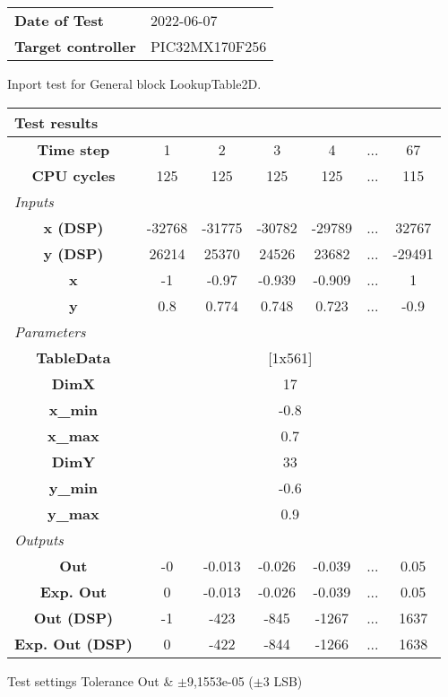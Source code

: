 \begin{tabular}{l l}
\textbf{Date of Test} & 2022-06-07 \tabularnewline
\textbf{Target controller} & PIC32MX170F256 \tabularnewline
\end{tabular}
\vspace{1ex}
Inport test for General block LookupTable2D.

\vspace{1em}
\begin{tabularx}{\textwidth}{|c|c|c|c|c|>{\centering\arraybackslash}X|c|}
\hline
\multicolumn{7}{|l|}{\cellcolor[gray]{0.8}\textbf{Test results}} \tabularnewline \hline
\textbf{Time step} & 1 & 2 & 3 & 4 & ... & 67 \tabularnewline \hline
\textbf{CPU cycles} & 125 & 125 & 125 & 125 & ... & 115 \tabularnewline \hline
\multicolumn{7}{|l|}{\cellcolor[gray]{0.9}\textit{Inputs}} \tabularnewline \hline
\textbf{x (DSP)} & -32768 & -31775 & -30782 & -29789 & ... & 32767 \tabularnewline \hline
\textbf{y (DSP)} & 26214 & 25370 & 24526 & 23682 & ... & -29491 \tabularnewline \hline
\textbf{x} & -1 & -0.97 & -0.939 & -0.909 & ... & 1 \tabularnewline \hline
\textbf{y} & 0.8 & 0.774 & 0.748 & 0.723 & ... & -0.9 \tabularnewline \hline
\multicolumn{7}{|l|}{\cellcolor[gray]{0.9}\textit{Parameters}} \tabularnewline \hline
\textbf{TableData} & \multicolumn{6}{c|}{[1x561]} \tabularnewline \hline
\textbf{DimX} & \multicolumn{6}{c|}{17} \tabularnewline \hline
\textbf{x\_min} & \multicolumn{6}{c|}{-0.8} \tabularnewline \hline
\textbf{x\_max} & \multicolumn{6}{c|}{0.7} \tabularnewline \hline
\textbf{DimY} & \multicolumn{6}{c|}{33} \tabularnewline \hline
\textbf{y\_min} & \multicolumn{6}{c|}{-0.6} \tabularnewline \hline
\textbf{y\_max} & \multicolumn{6}{c|}{0.9} \tabularnewline \hline
\multicolumn{7}{|l|}{\cellcolor[gray]{0.9}\textit{Outputs}} \tabularnewline \hline
\textbf{Out} & -0 & -0.013 & -0.026 & -0.039 & ... & 0.05 \tabularnewline \hline
\textbf{Exp. Out} & 0 & -0.013 & -0.026 & -0.039 & ... & 0.05 \tabularnewline \hline
\textbf{Out (DSP)} & -1 & -423 & -845 & -1267 & ... & 1637 \tabularnewline \hline
\textbf{Exp. Out (DSP)} & 0 & -422 & -844 & -1266 & ... & 1638 \tabularnewline \hline
\end{tabularx}
\vspace{1ex}

\begin{XtoCtabular}{Test settings}
Tolerance Out & $\pm$9,1553e-05 ($\pm$3 LSB) \tabularnewline \hline
\end{XtoCtabular}

